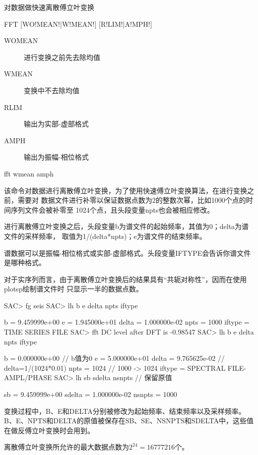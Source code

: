 \label{cmd:fft}

对数据做快速离散傅立叶变换

\begin{SACSTX}
FFT [WO!MEAN!|W!MEAN!] [R!LIM!|A!MPH!]
\end{SACSTX}

\begin{description}
\item [WOMEAN] 进行变换之前先去除均值
\item [WMEAN] 变换中不去除均值
\item [RLIM] 输出为实部-虚部格式
\item [AMPH] 输出为振幅-相位格式
\end{description}

\begin{SACDFT}
fft wmean amph
\end{SACDFT}

该命令对数据进行离散傅立叶变换，为了使用快速傅立叶变换算法，在进行变换之前，需要对
数据文件进行补零以保证数据点数为2的整数次幂，比如1000个点的时间序列文件会被补零至
1024个点，且头段变量npts也会被相应修改。

进行离散傅立叶变换之后，头段变量b为谱文件的起始频率，其值为0；delta为谱文件的采样频率，
取值为1/(delta*npts)；e为谱文件的结束频率。

谱数据可以是振幅-相位格式或实部-虚部格式。头段变量IFTYPE会告诉你谱文件是哪种格式。

对于实序列而言，由于离散傅立叶变换后的结果具有“共轭对称性”，因而在使用plotsp绘制谱文件时
只显示一半的数据点数。

\begin{SACCode}
SAC> fg seis
SAC> lh b e delta npts iftype

          b = 9.459999e+00
          e = 1.945000e+01
      delta = 1.000000e-02
       npts = 1000
     iftype = TIME SERIES FILE
SAC> fft
 DC level after DFT is -0.98547
SAC> lh b e delta npts iftype

          b = 0.000000e+00              // b值为0
          e = 5.000000e+01
      delta = 9.765625e-02              // delta=1/(1024*0.01)
       npts = 1024                      // 1000 -> 1024
     iftype = SPECTRAL FILE-AMPL/PHASE
SAC> lh sb sdelta nsnpts                // 保留原值

         sb = 9.459999e+00
     sdelta = 1.000000e-02
     nsnpts = 1000
\end{SACCode}

变换过程中，B、E和DELTA分别被修改为起始频率、结束频率以及采样频率。
B、E、NPTS和DELTA的原值被保存在SB、SE、NSNPTS和SDELTA中，这些值在做反傅立叶变换时会用到。

离散傅立叶变换所允许的最大数据点数为$2^{24}=16777216$个。

